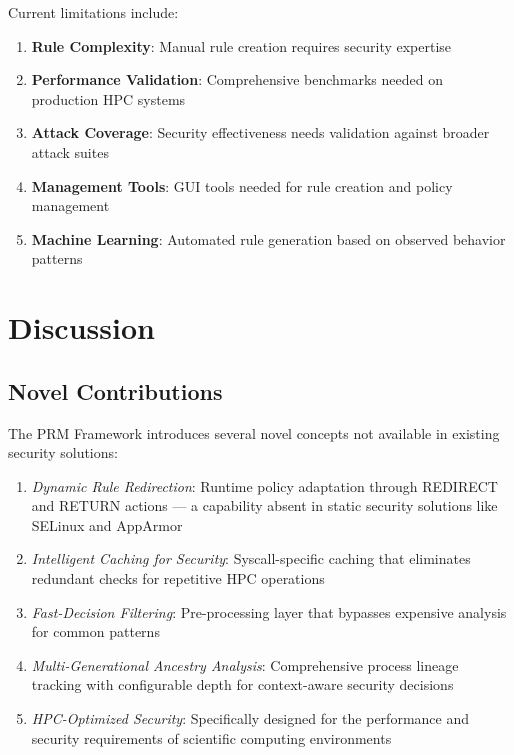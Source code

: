 \documentclass[]{sn-jnl}
\begin{document}
Current limitations include:
\begin{enumerate}
\item \textbf{Rule Complexity}: Manual rule creation requires security expertise
\item \textbf{Performance Validation}: Comprehensive benchmarks needed on
      production HPC systems
\item \textbf{Attack Coverage}: Security effectiveness needs validation against
      broader attack suites
\item \textbf{Management Tools}: GUI tools needed for rule creation and policy
      management
\item \textbf{Machine Learning}: Automated rule generation based on observed
      behavior patterns
\end{enumerate}

\section{Discussion}
\label{sec:discussion}

\subsection{Novel Contributions}

The PRM Framework introduces several novel concepts not available in existing
security solutions:

\begin{enumerate}
\item \emph{Dynamic Rule Redirection}: Runtime policy adaptation through REDIRECT
      and RETURN actions --- a capability absent in static security solutions like
      SELinux and AppArmor
\item \emph{Intelligent Caching for Security}: Syscall-specific caching that
      eliminates redundant checks for repetitive HPC operations
\item \emph{Fast-Decision Filtering}: Pre-processing layer that bypasses expensive
      analysis for common patterns
\item \emph{Multi-Generational Ancestry Analysis}: Comprehensive process lineage
      tracking with configurable depth for context-aware security decisions
\item \emph{HPC-Optimized Security}: Specifically designed for the performance and
      security requirements of scientific computing environments
\end{enumerate}
\end{document}
